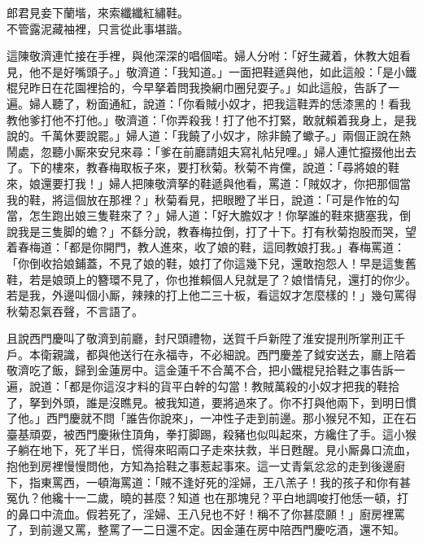 \begin{myquote}
郎君見妾下蘭堦，來索纖纖紅繡鞋。\\不管露泥藏袖裡，只言從此事堪諧。
\end{myquote}

這陳敬濟連忙接在手裡，與他深深的唱個喏。{}婦人分咐：「好生藏着，休教大姐看見，{}他不是好嘴頭子。」敬濟道：「我知道。」一面把鞋遞與他，如此這般：「是小鐵棍兒昨日在花園裡拾的，今早拏着問我換網巾圈兒耍子。」如此這般，告訴了一遍。婦人聽了，粉面通紅，說道：「你看賊小奴才，把我這鞋弄的恁漆黑的！看我教他爹打他不打他。」敬濟道：「你弄殺我！打了他不打緊，敢就賴着我身上，是我說的。千萬休要說罷。」婦人道：「我饒了小奴才，除非饒了蠍子。」兩個正說在熱鬧處，忽聽小厮來安兒來尋：「爹在前廳請姐夫寫礼帖兒哩。」婦人連忙攛掇他出去了。下的樓來，教春梅取板子來，要打秋菊。秋菊不肯儻，說道：「尋將娘的鞋來，娘還要打我！」婦人把陳敬濟拏的鞋遞與他看，罵道：「賊奴才，你把那個當我的鞋，將這個放在那裡？」秋菊看見，把眼瞪了半日，說道：「可是作恠的勾當，怎生跑出娘三隻鞋來了？」婦人道：「好大膽奴才！你拏誰的鞋來搪塞我，倒說我是三隻脚的蟾？」不繇分說，教春梅拉倒，打了十下。打有秋菊抱股而哭，望着春梅道：「都是你開門，教人進來，收了娘的鞋，這囘教娘打我。」{}春梅罵道：「你倒收拾娘鋪蓋，不見了娘的鞋，娘打了你這幾下兒，還敢抱怨人！早是這隻舊鞋，若是娘頭上的簪環不見了，你也推賴個人兒就是了？{}娘惜情兒，還打的你少。若是我，外邊叫個小厮，辣辣的打上他二三十板，看這奴才怎麼樣的！」幾句罵得秋菊忍氣吞聲，不言語了。

且說西門慶叫了敬濟到前廳，封尺頭禮物，送賀千戶新陞了淮安提刑所掌刑正千戶。本衛親識，都與他送行在永福寺，不必細說。西門慶差了鉞安送去，廳上陪着敬濟吃了飯，歸到金蓮房中。這金蓮千不合萬不合，把小鐵棍兒拾鞋之事告訴一遍，說道：「都是你這沒才料的貨平白幹的勾當！教賊萬殺的小奴才把我的鞋拾了，拏到外頭，誰是沒瞧見。被我知道，要將過來了。你不打與他兩下，到明日慣了他。」西門慶就不問「誰告你說來」，一冲性子走到前邊。那小猴兒不知，正在石臺基頑耍，被西門慶揪住頂角，拳打脚踢，殺豬也似叫起來，方纔住了手。這小猴子躺在地下，死了半日，慌得來昭兩口子走來扶救，半日甦醒。見小厮鼻口流血，抱他到房裡慢慢問他，方知為拾鞋之事惹起事來。這一丈青氣忿忿的走到後邊廚下，指東罵西，一頓海罵道：「賊不逢好死的淫婦，王八羔子！我的孩子和你有甚冤仇？他纔十一二歲，曉的甚麼？知道𣭈也在那塊兒？平白地調唆打他恁一頓，打的鼻口中流血。假若死了，淫婦、王八兒也不好！稱不了你甚麼願！」廚房裡罵了，到前邊又罵，整罵了一二日還不定。因金蓮在房中陪西門慶吃酒，還不知。

